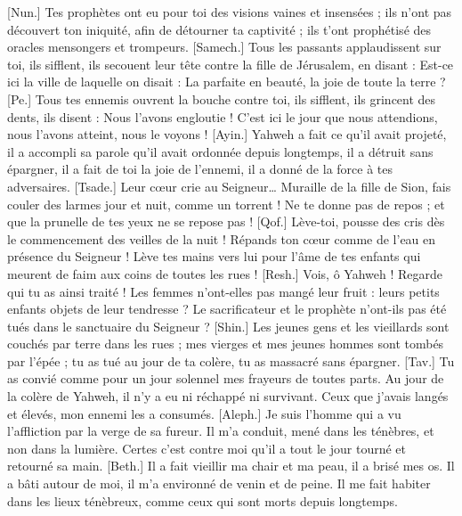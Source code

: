 \begin{multicols}{2}
[Nun.] Tes prophètes ont eu pour toi des visions vaines et insensées ; ils n'ont pas découvert ton iniquité, afin de détourner ta captivité ; ils t'ont prophétisé des oracles mensongers et trompeurs.
[Samech.] Tous les passants applaudissent sur toi, ils sifflent, ils secouent leur tête contre la fille de Jérusalem, en disant : Est-ce ici la ville de laquelle on disait : La parfaite en beauté, la joie de toute la terre ?
[Pe.] Tous tes ennemis ouvrent la bouche contre toi, ils sifflent, ils grincent des dents, ils disent : Nous l'avons engloutie ! C'est ici le jour que nous attendions, nous l'avons atteint, nous le voyons !
[Ayin.] Yahweh a fait ce qu'il avait projeté, il a accompli sa parole qu'il avait ordonnée depuis longtemps, il a détruit sans épargner, il a fait de toi la joie de l'ennemi, il a donné de la force à tes adversaires.
[Tsade.] Leur cœur crie au Seigneur… Muraille de la fille de Sion, fais couler des larmes jour et nuit, comme un torrent ! Ne te donne pas de repos ; et que la prunelle de tes yeux ne se repose pas !
[Qof.] Lève-toi, pousse des cris dès le commencement des veilles de la nuit ! Répands ton cœur comme de l'eau en présence du Seigneur ! Lève tes mains vers lui pour l'âme de tes enfants qui meurent de faim aux coins de toutes les rues !
[Resh.] Vois, ô Yahweh ! Regarde qui tu as ainsi traité ! Les femmes n'ont-elles pas mangé leur fruit : leurs petits enfants objets de leur tendresse ? Le sacrificateur et le prophète n'ont-ils pas été tués dans le sanctuaire du Seigneur ?
[Shin.] Les jeunes gens et les vieillards sont couchés par terre dans les rues ; mes vierges et mes jeunes hommes sont tombés par l'épée ; tu as tué au jour de ta colère, tu as massacré sans épargner.
[Tav.] Tu as convié comme pour un jour solennel mes frayeurs de toutes parts. Au jour de la colère de Yahweh, il n'y a eu ni réchappé ni survivant. Ceux que j'avais langés et élevés, mon ennemi les a consumés.
\VerseOne{}[Aleph.] Je suis l'homme qui a vu l'affliction par la verge de sa fureur.
Il m'a conduit, mené dans les ténèbres, et non dans la lumière.
Certes c'est contre moi qu'il a tout le jour tourné et retourné sa main.
[Beth.] Il a fait vieillir ma chair et ma peau, il a brisé mes os.
Il a bâti autour de moi, il m'a environné de venin et de peine.
Il me fait habiter dans les lieux ténèbreux, comme ceux qui sont morts depuis longtemps.

\end{multicols}
